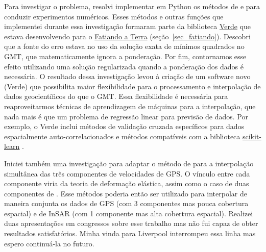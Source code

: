 \documentclass[12pt,a4paper,oneside]{book}
\newcommand{\FatiandoLink}{\href{https://www.fatiando.org}{Fatiando a Terra}}
\begin{document}
Para investigar o problema, resolvi implementar em Python os métodos de
\citet{Sandwell1987} e \citet{Sandwell2016} para conduzir experimentos
numéricos.
Esses métodos e outras funções que implementei durante essa investigação
formaram parte da biblioteca \href{https://www.fatiando.org/verde}{Verde}
que estava desenvolvendo para o \FatiandoLink{} (seção~\ref{sec_fatiando}).
Descobri que a fonte do erro estava no uso da solução exata de mínimos
quadrados no GMT, que matematicamente ignora a ponderação.
Por fim, contornamos esse efeito utilizando uma solução regularizada quando
a ponderação dos dados é necessária.
O resultado dessa investigação levou à criação de um software novo (Verde) que
possibilita maior flexibilidade para o processamento e interpolação de dados
geocientíficos do que o GMT.
Essa flexibilidade é necessária para reaproveitarmos técnicas de aprendizagem
de máquinas para a interpolação, que nada mais é que um problema de regressão
linear para previsão de dados.
Por exemplo, o Verde inclui métodos de validação cruzada específicos para dados
espacialmente auto-correlacionados \citep{Roberts2017} e métodos compatíveis
com a biblioteca \href{https://scikit-learn.org/stable/}{scikit-learn}
\citep{Pedregosa2011}.

Iniciei também uma investigação para adaptar o método de \citet{Sandwell2016}
para a interpolação simultânea das três componentes de velocidades de GPS.
O vínculo entre cada componente viria da teoria de deformação elástica, assim
como o caso de duas componentes de \citet{Sandwell2016}.
Esse métodos poderia então ser utilizado para interpolar de maneira conjunta
os dados de GPS (com 3 componentes mas pouca cobertura espacial) e de InSAR
(com 1 componente mas alta cobertura espacial).
Realizei duas apresentações em congressos sobre esse trabalho mas não fui capaz
de obter resultados satisfatórios.
Minha vinda para Liverpool interrompeu essa linha mas espero continuá-la no
futuro.
\end{document}
